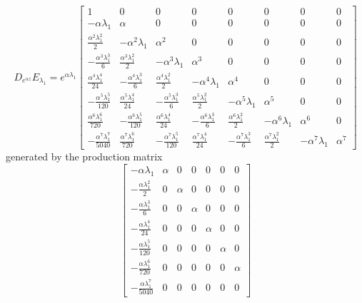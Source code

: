 \iffalse %
\begin{displaymath}
D_{e^{\alpha z}}E_{\lambda_{1}} = e^{\alpha \lambda_{1}} \left[\begin{matrix}1 & 0 & 0 & 0 & 0 & 0 & 0 & 0\\- \alpha  \lambda_{1} & \alpha  & 0 & 0 & 0 & 0 & 0 & 0\\\frac{\alpha^{2} \lambda_{1}^{2}}{2}  & - \alpha^{2}  \lambda_{1} & \alpha^{2}  & 0 & 0 & 0 & 0 & 0\\- \frac{\alpha^{3} \lambda_{1}^{3}}{6}  & \frac{\alpha^{3} \lambda_{1}^{2}}{2}  & - \alpha^{3}  \lambda_{1} & \alpha^{3}  & 0 & 0 & 0 & 0\\\frac{\alpha^{4} \lambda_{1}^{4}}{24}  & - \frac{\alpha^{4} \lambda_{1}^{3}}{6}  & \frac{\alpha^{4} \lambda_{1}^{2}}{2}  & - \alpha^{4}  \lambda_{1} & \alpha^{4}  & 0 & 0 & 0\\- \frac{\alpha^{5} \lambda_{1}^{5}}{120}  & \frac{\alpha^{5} \lambda_{1}^{4}}{24}  & - \frac{\alpha^{5} \lambda_{1}^{3}}{6}  & \frac{\alpha^{5} \lambda_{1}^{2}}{2}  & - \alpha^{5}  \lambda_{1} & \alpha^{5}  & 0 & 0\\\frac{\alpha^{6} \lambda_{1}^{6}}{720}  & - \frac{\alpha^{6} \lambda_{1}^{5}}{120}  & \frac{\alpha^{6} \lambda_{1}^{4}}{24}  & - \frac{\alpha^{6} \lambda_{1}^{3}}{6}  & \frac{\alpha^{6} \lambda_{1}^{2}}{2}  & - \alpha^{6}  \lambda_{1} & \alpha^{6}  & 0\\- \frac{\alpha^{7} \lambda_{1}^{7}}{5040}  & \frac{\alpha^{7} \lambda_{1}^{6}}{720}  & - \frac{\alpha^{7} \lambda_{1}^{5}}{120}  & \frac{\alpha^{7} \lambda_{1}^{4}}{24}  & - \frac{\alpha^{7} \lambda_{1}^{3}}{6}  & \frac{\alpha^{7} \lambda_{1}^{2}}{2}  & - \alpha^{7}  \lambda_{1} & \alpha^{7} \end{matrix}\right]
\end{displaymath}
generated by the production matrix
\begin{displaymath}
\left[\begin{matrix}- \alpha \lambda_{1} & \alpha & 0 & 0 & 0 & 0 & 0\\- \frac{\alpha \lambda_{1}^{2}}{2} & 0 & \alpha & 0 & 0 & 0 & 0\\- \frac{\alpha \lambda_{1}^{3}}{6} & 0 & 0 & \alpha & 0 & 0 & 0\\- \frac{\alpha \lambda_{1}^{4}}{24} & 0 & 0 & 0 & \alpha & 0 & 0\\- \frac{\alpha \lambda_{1}^{5}}{120} & 0 & 0 & 0 & 0 & \alpha & 0\\- \frac{\alpha \lambda_{1}^{6}}{720} & 0 & 0 & 0 & 0 & 0 & \alpha\\- \frac{\alpha \lambda_{1}^{7}}{5040} & 0 & 0 & 0 & 0 & 0 & 0\end{matrix}\right]
\end{displaymath}
